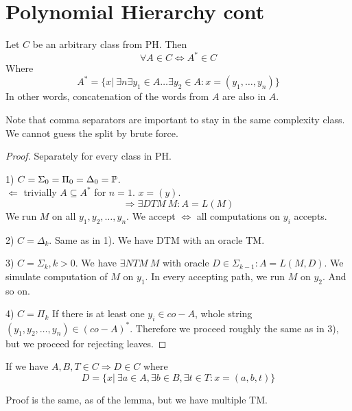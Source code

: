 \section{\texorpdfstring{Polynomial Hierarchy cont}{Polynomial Hierarchy cont}}
\vspace{5mm}
\large

\begin{lemma}
	Let $C$ be an arbitrary class from PH.
	Then
	\[ \forall A \in C \iff A^{\ast} \in C \]
	Where
	\[ A^{\ast} = \{ x |\ \exists n \exists y_1 \in A \ldots \exists y_2 \in A: x = (y_1, \ldots, y_n) \} \]
	In other words, concatenation of the words from $A$ are also in $A$.

	Note that comma separators are important to stay in the same complexity class.
	We cannot guess the split by brute force.
\end{lemma}
\begin{proof} Separately for every class in PH.

	1) $C = \Sigma_0 = \Pi_0 = \Delta_0 = \operatorname{\mathbb{P}}$.\\
	$\Leftarrow$ trivially $A \subseteq A^{\ast}$ for $n = 1$.
	$x = (y)$.\\
	\[ \Rightarrow \exists DTM\ M: A = L(M) \]
	We run $M$ on all $y_1, y_2, \ldots, y_n$.
	We accept $\iff$ all computations on $y_i$ accepts.

	2) $C = \Delta_k$.
	Same as in 1). We have DTM with an oracle TM.

	3) $C = \Sigma_k, k > 0$.
	We have
	$ \exists NTM\ M$ with oracle $D \in \Sigma_{k - 1}: A = L(M, D)$.
	We simulate computation of $M$ on $y_1$.
	In every accepting path, we run $M$ on $y_2$. And so on.

	4) $C = \Pi_k$
	If there is at least one $y_i \in co-A$, whole string $(y_1, y_2, \ldots, y_n) \in (co-A)^{\ast}$.
	Therefore we proceed roughly the same as in 3), but we proceed for rejecting leaves.
\end{proof}

\begin{consequence}
	If we have $A,B,T \in C \Rightarrow D \in C$ where
	\[ D = \{ x |\ \exists a \in A, \exists b \in B, \exists t \in T: x = (a, b, t) \} \]

	Proof is the same, as of the lemma, but we have multiple TM.
\end{consequence}

